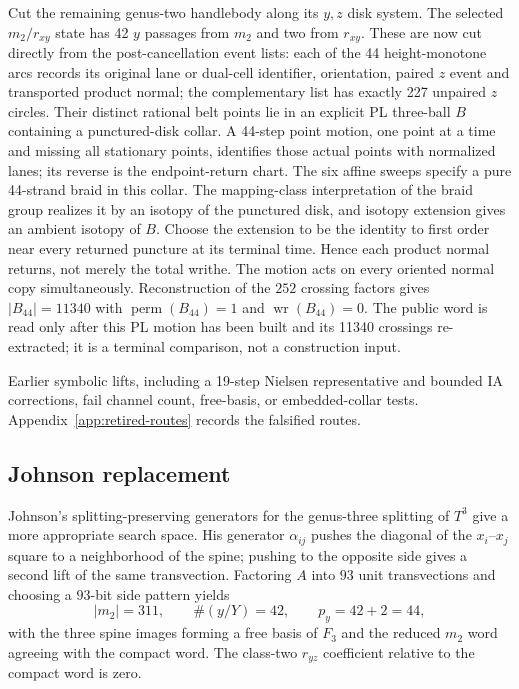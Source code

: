 Cut the remaining genus-two handlebody along its $y,z$ disk system.  The
selected $m_2/r_{xy}$ state has 42 $y$ passages from $m_2$ and two from
$r_{xy}$.  These are now cut directly from the post-cancellation event lists:
each of the 44 height-monotone arcs records its original lane or dual-cell
identifier, orientation, paired $z$ event and transported product normal;
the complementary list has exactly 227 unpaired $z$ circles.  Their distinct
rational belt points lie in an explicit PL three-ball $B$ containing a
punctured-disk collar.  A 44-step point motion, one point at a time and missing
all stationary points, identifies those actual points with normalized lanes;
its reverse is the endpoint-return chart.
The six affine sweeps specify a pure 44-strand braid in this collar.  The
mapping-class interpretation of the braid group realizes it by an isotopy of
the punctured disk, and isotopy extension gives an ambient isotopy of $B$.
Choose the extension to be the identity to first order near every returned
puncture at its terminal time.  Hence each product normal returns, not merely
the total writhe.  The motion acts on every oriented normal copy
simultaneously.  Reconstruction of the $252$ crossing factors gives
$|B_{44}|=11340$ with $\operatorname{perm}(B_{44})=1$ and
$\operatorname{wr}(B_{44})=0$.  The public word is read only after this PL
motion has been built and its 11340 crossings re-extracted; it is a terminal
comparison, not a construction input.

\begin{remark}
Earlier symbolic lifts, including a 19-step Nielsen representative and
bounded IA corrections, fail channel count, free-basis, or embedded-collar
tests.  Appendix~\ref{app:retired-routes} records the falsified routes.
\end{remark}

\subsection{Johnson replacement}

Johnson's splitting-preserving generators for the genus-three splitting of
$T^3$ \cite{Johnson2011} give a more appropriate search space.  His generator
$\alpha_{ij}$ pushes the diagonal of the $x_i$--$x_j$ square to a
neighborhood of the spine; pushing to the opposite side gives a second lift of
the same transvection.  Factoring $A$ into $93$ unit transvections and choosing
a $93$-bit side pattern yields
\[
|m_2|=311,\qquad \#(y/Y)=42,\qquad p_y=42+2=44,
\]
with the three spine images forming a free basis of $F_3$ and the reduced
$m_2$ word agreeing with the compact word.  The class-two $r_{yz}$ coefficient
relative to the compact word is zero.


